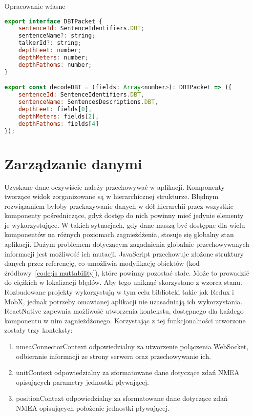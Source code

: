 \documentclass[skorowidz,skroty]{dyplomWEZUT}
\begin{document}
{Opracowanie własne}{\label{code: DBT codec}}
\begin{lstlisting}[language=JavaScript]
export interface DBTPacket {
    sentenceId: SentenceIdentifiers.DBT;
    sentenceName?: string;
    talkerId?: string;
    depthFeet: number;
    depthMeters: number;
    depthFathoms: number;
}

export const decodeDBT = (fields: Array<number>): DBTPacket => ({
    sentenceId: SentenceIdentifiers.DBT,
    sentenceName: SentencesDescriptions.DBT,
    depthFeet: fields[0],
    depthMeters: fields[2],
    depthFathoms: fields[4]
});

\end{lstlisting}

\section{Zarządzanie danymi}\label{sec: server communication}
Uzyskane dane oczywiście należy przechowywać w aplikacji. Komponenty tworzące widok zorganizowane są w hierarchicznej strukturze. Błędnym rozwiązaniem byłoby przekazywanie danych w dół hierarchii przez wszystkie komponenty pośredniczące, gdyż dostęp do nich powinny mieć jedynie elementy je wykorzystujące. W takich sytuacjach, gdy dane muszą być dostępne dla wielu komponentów na różnych poziomach zagnieżdżenia, stosuje się globalny stan aplikacji. Dużym problemem dotyczącym zagadnienia globalnie przechowywanych informacji jest możliwość ich mutacji. JavaScript przechowuje złożone struktury danych przez referencję, co umożliwia modyfikację obiektów (kod źródłowy~\ref{code:js muttability}), które powinny pozostać stałe. Może to prowadzić do ciężkich w lokalizacji błędów. Aby tego uniknąć skorzystano z wzorca stanu. Rozbudowane projekty wykorzystują w tym celu biblioteki takie jak Redux i MobX, jednak potrzeby omawianej aplikacji nie uzasadniają ich wykorzystania. ReactNative zapewnia możliwość utworzenia kontekstu, dostępnego dla każdego komponentu w nim zagnieżdżonego. Korzystając z tej funkcjonalności utworzone zostały trzy konteksty:

\begin{enumerate}
 \item nmeaConnectorContext odpowiedzialny za utworzenie połączenia WebSocket, odbieranie informacji ze strony serwera oraz przechowywanie ich. 
 
 \item unitContext odpowiedzialny za sformatowane dane dotyczące zdań NMEA opisujących parametry jednostki pływającej. 
 
 \item positionContext odpowiedzialny za sformatowane dane dotyczące zdań NMEA opisujących położenie jednostki pływającej. 
 
\end{enumerate}
\end{document}

